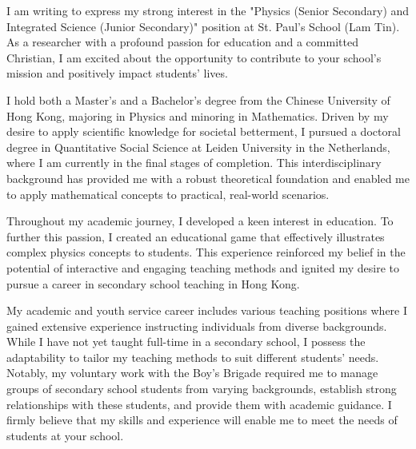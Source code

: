 \documentclass[11pt, a4paper]{awesome-cv}
\begin{document}
\makecvheader[R]

\makecvfooter
  {}%
  {}%
  {}

\makelettertitle

\begin{cvletter}

I am writing to express my strong interest in the "Physics (Senior Secondary) and Integrated Science (Junior Secondary)" position at St. Paul's School (Lam Tin). As a researcher with a profound passion for education and a committed Christian, I am excited about the opportunity to contribute to your school's mission and positively impact students' lives.

I hold both a Master's and a Bachelor's degree from the Chinese University of Hong Kong, majoring in Physics and minoring in Mathematics. Driven by my desire to apply scientific knowledge for societal betterment, I pursued a doctoral degree in Quantitative Social Science at Leiden University in the Netherlands, where I am currently in the final stages of completion. This interdisciplinary background has provided me with a robust theoretical foundation and enabled me to apply mathematical concepts to practical, real-world scenarios.

Throughout my academic journey, I developed a keen interest in education. To further this passion, I created an educational game that effectively illustrates complex physics concepts to students. This experience reinforced my belief in the potential of interactive and engaging teaching methods and ignited my desire to pursue a career in secondary school teaching in Hong Kong.

My academic and youth service career includes various teaching positions where I gained extensive experience instructing individuals from diverse backgrounds. While I have not yet taught full-time in a secondary school, I possess the adaptability to tailor my teaching methods to suit different students' needs. Notably, my voluntary work with the Boy's Brigade required me to manage groups of secondary school students from varying backgrounds, establish strong relationships with these students, and provide them with academic guidance. I firmly believe that my skills and experience will enable me to meet the needs of students at your school.


\end{cvletter}
\end{document}
